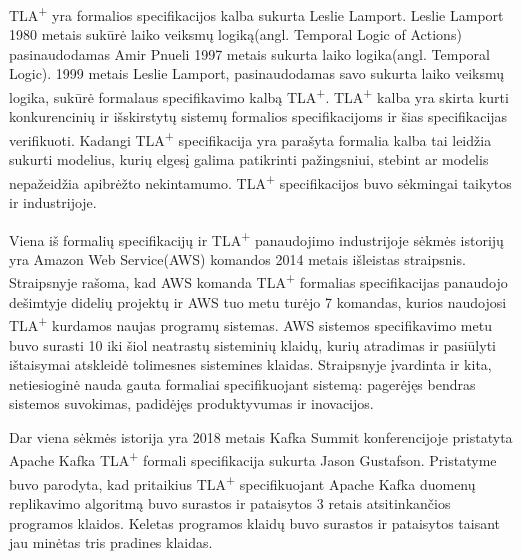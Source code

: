 \documentclass{VUMIFPSmagistrinis}
\begin{document}
		TLA\textsuperscript{+} yra formalios specifikacijos kalba sukurta Leslie Lamport.
		Leslie Lamport 1980 metais sukūrė laiko veiksmų logiką(angl. Temporal Logic of Actions) pasinaudodamas Amir Pnueli 1997 metais sukurta laiko logika(angl. Temporal Logic).
		1999 metais Leslie Lamport, pasinaudodamas savo sukurta laiko veiksmų logika, sukūrė formalaus specifikavimo kalbą TLA\textsuperscript{+}.
		TLA\textsuperscript{+} kalba yra skirta kurti konkurencinių ir išskirstytų sistemų formalios specifikacijoms ir šias specifikacijas verifikuoti.
		Kadangi TLA\textsuperscript{+} specifikacija yra parašyta formalia kalba tai leidžia sukurti modelius, kurių elgesį galima patikrinti pažingsniui, stebint ar modelis nepažeidžia apibrėžto nekintamumo.
		TLA\textsuperscript{+} specifikacijos buvo sėkmingai taikytos ir industrijoje.


		Viena iš formalių specifikacijų ir TLA\textsuperscript{+} panaudojimo industrijoje sėkmės istorijų yra Amazon Web Service(AWS) komandos 2014 metais išleistas straipsnis.
		Straipsnyje rašoma,  kad AWS komanda TLA\textsuperscript{+} formalias specifikacijas panaudojo dešimtyje didelių projektų ir AWS tuo metu turėjo 7 komandas, kurios naudojosi TLA\textsuperscript{+} kurdamos naujas programų sistemas.
		AWS sistemos specifikavimo metu buvo surasti 10 iki šiol neatrastų sisteminių klaidų, kurių atradimas ir pasiūlyti ištaisymai atskleidė tolimesnes sistemines klaidas.
		Straipsnyje įvardinta ir kita, netiesioginė nauda gauta formaliai specifikuojant sistemą: pagerėjęs bendras sistemos suvokimas, padidėjęs produktyvumas ir inovacijos.
		

		Dar viena sėkmės istorija yra 2018 metais Kafka Summit konferencijoje pristatyta Apache Kafka TLA\textsuperscript{+} formali specifikacija sukurta Jason Gustafson.
		Pristatyme buvo parodyta, kad pritaikius TLA\textsuperscript{+} specifikuojant Apache Kafka duomenų replikavimo algoritmą buvo surastos ir pataisytos 3 retais atsitinkančios programos klaidos.
		Keletas programos klaidų buvo surastos ir pataisytos taisant jau minėtas tris pradines klaidas.
\end{document}

